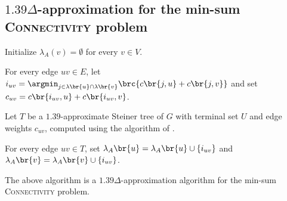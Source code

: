 \subsection{$1.39\Delta$-approximation for the min-sum \textsc{Connectivity} problem}
\begin{algorithm}[H]
\caption{A $1.39\Delta$-approximation algorithm for the min-sum \textsc{Connectivity} problem.}
Initialize $\lambda_A(v) = \emptyset$ for every $v \in V$.

For every edge $uv\in E$, let $i_{uv}=\argmin_{j\in\lambda\br{u}\cap\lambda\br{v}}\brc{c\br{j, u}+c\br{j, v}}$ and set $c_{uv} = c\br{i_{uv}, u}+c\br{i_{uv}, v}$. 

Let $T$ be a $1.39$-approximate Steiner tree of $G$ with terminal set $U$ and edge weights $c_{uv}$, computed using the algorithm of \cite{ByrkaGRS10}.

For every edge $uv\in T$, set $\lambda_A\br{u} = \lambda_A\br{u} \cup \{i_{uv}\}$ and $\lambda_A\br{v} = \lambda_A\br{v} \cup \{i_{uv}\}$.

\end{algorithm}
\begin{theorem}
    The above algorithm is a $1.39\Delta$-approximation algorithm for the min-sum \textsc{Connectivity} problem.
\end{theorem}
